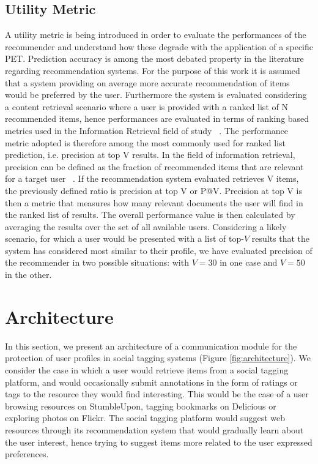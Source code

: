 \subsection{Utility Metric}
A utility metric is being introduced in order to evaluate the performances of the recommender and understand how these degrade with the application of a specific PET.
Prediction accuracy is among the most debated property in the literature regarding recommendation systems. For the purpose of this work it is assumed that a system providing on average more accurate recommendation of items would be preferred by the user. Furthermore the system is evaluated considering a content retrieval scenario where a user is provided with a ranked list of N recommended items, hence performances are evaluated in terms of ranking based metrics used in the Information Retrieval field of study~\cite{a16} .
The performance metric adopted is therefore among the most commonly used for ranked list prediction, i.e. precision at top V results. In the field of information retrieval, precision can be defined as the fraction of recommended items that are relevant for a target user~\cite{a17} . If the recommendation system evaluated retrieves V items, the previously defined ratio is precision at top V or P@V. Precision at top V is then a metric that measures how many relevant documents the user will find in the ranked list of results.
The overall performance value is then calculated by averaging the results over the set of all available users.
Considering a likely scenario, for which a user would be presented with a list of top-$V$ results that the system has considered most similar to their profile, we have evaluated precision of the recommender in two possible situations: with $V=30$ in one case and $V=50$ in the other.

\section{Architecture}
\label{sec:architecture}
In this section, we present an architecture of a communication module for the protection of user profiles in social tagging systems (Figure \ref{fig:architecture}). We consider the case in which a user would retrieve items from a social tagging platform, and would occasionally submit annotations in the form of ratings or tags to the resource they would find interesting. This would be the case of a user browsing resources on StumbleUpon, tagging bookmarks on Delicious or exploring photos on Flickr. The social tagging platform would suggest web resources through its recommendation system that would gradually learn about the user interest, hence trying to suggest items more related to the user expressed preferences.

